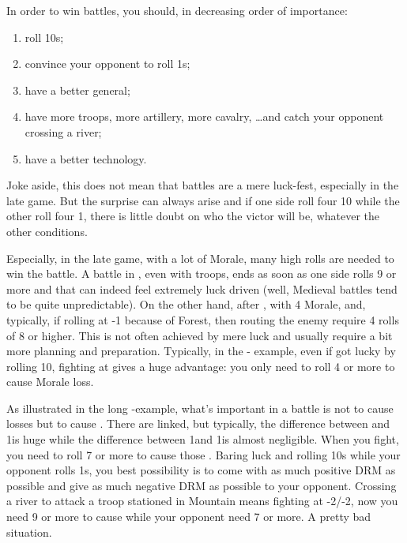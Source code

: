 \begin{playtip}
  In order to win battles, you should, in decreasing order of importance:
  \begin{enumerate}
  \item roll 10s;
  \item convince your opponent to roll 1s;
  \item have a better general;
  \item have more troops, more artillery, more cavalry, \ldots and catch your
    opponent crossing a river;
  \item have a better technology.
  \end{enumerate}
  Joke aside, this does not mean that battles are a mere luck-fest, especially
  in the late game. But the surprise can always arise and if one side roll
  four 10 while the other roll four 1, there is little doubt on who the victor
  will be, whatever the other conditions.

  Especially, in the late game, with a lot of Morale, many high rolls are
  needed to win the battle. A battle in \TMED, even with 
  troops, ends as soon as one side rolls 9 or more and that can indeed feel
  extremely luck driven (well, Medieval battles tend to be quite
  unpredictable). On the other hand, after \TMUS, with 4 Morale, and,
  typically, if rolling at -1 because of Forest, then routing the enemy
  require 4 rolls of 8 or higher. This is not often achieved by mere luck and
  usually require a bit more planning and preparation. Typically, in the
  \SUE- example, even if \SUE got lucky by rolling 10,
  fighting at  gives a huge advantage: you only need to roll 4 or
  more to cause Morale loss.

  As illustrated in the long \FRA-\HIS example, what's important in a battle
  is not to cause losses but to cause \textetoile. There are linked, but
  typically, the difference between \texttd and 1\textetoile is huge while the
  difference between 1\textetoile and 1\texttu\textetoile is almost
  negligible. When you fight, you need to roll 7 or more to cause those
  \textetoile. Baring luck and rolling 10s while your opponent rolls 1s, you
  best possibility is to come with as much positive DRM as possible and give
  as much negative DRM as possible to your opponent. Crossing a river to
  attack a troop stationed in Mountain means fighting at -2/-2, now you need 9
  or more to cause \textetoile while your opponent need 7 or more. A pretty
  bad situation.
\end{playtip}

